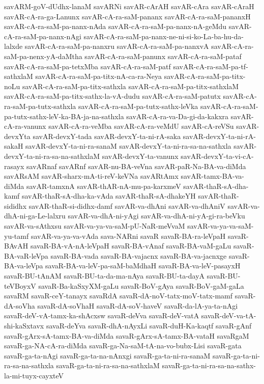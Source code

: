{savARM-goV-dUdhx-lanaM
savARNi
savAR-cArAH
savAR-cAra
savAR-cAraH
savAR-cA-ra-ga-Lanunx
savAR-cA-ra-saM-pananx
savAR-cA-ra-saM-pananxH
savAR-cA-ra-saM-pa-nanx-nAda
savAR-cA-ra-saM-pa-nanx-nA-geMdu
savAR-cA-ra-saM-pa-nanx-nAgi
savAR-cA-ra-saM-pa-nanx-ne-ni-si-ko-La-ba-hu-da-lalxde
savAR-cA-ra-saM-pa-nanxru
savAR-cA-ra-saM-pa-nanxvA
savAR-cA-ra-saM-pa-nenx-yA-daMtha
savAR-cA-ra-saM-panunx
savAR-cA-ra-saM-pataf
savAR-cA-ra-saM-pa-tetxMba
savAR-cA-ra-saM-patf
savAR-cA-ra-saM-pa-tf-sathxlaM
savAR-cA-ra-saM-pa-titx-nA-ca-ra-Neya
savAR-cA-ra-saM-pa-titx-noLu
savAR-cA-ra-saM-pa-titx-sathxla
savAR-cA-ra-saM-pa-titx-sathxlaM
savAR-cA-ra-saM-pa-titx-sathx-la-vA-dudu
savAR-cA-ra-saM-patutx
savAR-cA-ra-saM-pa-tutx-sathxla
savAR-cA-ra-saM-pa-tutx-sathx-leVka
savAR-cA-ra-saM-pa-tutx-sathx-leV-ka-BA-ja-na-sathxla
savAR-cA-ra-va-Da-gi-da-kakxra
savAR-cA-ra-vanunx
savAR-cA-ra-veMba
savAR-cA-ra-veMdU
savAR-cA-reVSu
savAR-devxYta
savAR-devxY-tada
savAR-devxY-ta-ni-rA-saka
savAR-devxY-ta-ni-rA-sakaH
savAR-devxY-ta-ni-ra-sanaM
savAR-devxY-ta-ni-ra-sa-na-sathxla
savAR-devxY-ta-ni-ra-sa-na-sathxlaM
savAR-devxY-ta-vanunx
savAR-devxY-ta-vi-cA-rasayx
savARnaf
savARnf
savAR-nu-BA-veVna
savAR-paR-Na-BA-va-diMda
savARsAM
savAR-sharx-mA-ti-reV-keVNa
savARtAmx
savAR-tamx-BA-va-diMda
savAR-tamxnA
savAR-thAR-nA-mu-pa-karxmeV
savAR-thaR-sA-dha-kamf
savAR-thaR-sA-dha-ka-vAda
savAR-thaR-sA-dhakeYH
savAR-thaR-sididhx
savAR-thaR-si-didhx-damf
savAR-va-dhAni
savAR-va-dhAniV
savAR-va-dhA-ni-ga-Le-lalxru
savAR-va-dhA-ni-yAgi
savAR-va-dhA-ni-yA-gi-ra-beVku
savAR-va-sAthxsu
savAR-va-ya-va-saM-pU-NaR-meVvaM
savAR-va-ya-va-saM-yu-tamf
savAR-va-ya-va-vAda
sava-NARni
savaR
savaR-BA-ra-leVpaH
savaR-BAvAH
savaR-BA-vA-nA-leVpaH
savaR-BA-vAnaf
savaR-BA-vaM-gaLu
savaR-BA-vaR-leVpa
savaR-BA-vada
savaR-BA-vajacnx
savaR-BA-va-jacnxge
savaR-BA-va-leVpa
savaR-BA-va-leV-pa-saM-baMdhaH
savaR-BA-va-leV-pasayxH
savaR-BU-tAnAM
savaR-BU-ta-da-ma-nAya
savaR-BU-ta-dayA
savaR-BU-teVBoyxV
savaR-Ba-kaSxyXM-gaLu
savaR-BoV-gAya
savaR-BoV-gaM-gaLa
savaRM
savaR-ceY-tanayx
savaRdA
savaR-dA-noV-tatx-moV-tatx-mamf
savaR-dA-soVha
savaR-dA-soVhaH
savaR-dA-soV-haveV
savaR-da-lA-ya-ta-nAgi
savaR-deV-vA-tamx-ka-shAcxsw
savaR-deVva
savaR-deV-vatA
savaR-deV-va-tA-shi-kaSxtavx
savaR-deYva
savaR-dhA-nAyxLi
savaR-duH-Ka-kaqtf
savaR-gAnf
savaR-gArx-sA-tamx-BA-va-diMda
savaR-gArx-sA-tamx-BA-vataH
savaRgaM
savaR-ga-NA-cA-ra-diMda
savaR-ga-Na-saM-tA-na-vo-bubx-Lisi
savaR-gata
savaR-ga-ta-nAgi
savaR-ga-ta-na-nAnxgi
savaR-ga-ta-ni-ra-sanaM
savaR-ga-ta-ni-ra-sa-na-sathxla
savaR-ga-ta-ni-ra-sa-na-sathxlaM
savaR-ga-ta-ni-ra-sa-na-sathx-la-mi-tuyx-cayxteV
}
